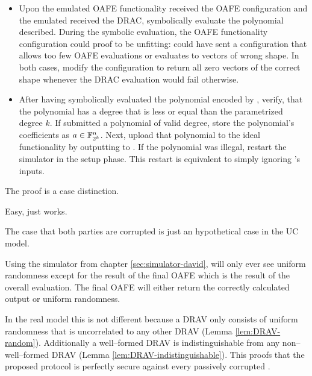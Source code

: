\begin{itemize}

  \item Upon the emulated OAFE functionality received the OAFE configuration and
    the emulated \JWpTwo{} received the DRAC, symbolically evaluate the
    polynomial \JWpOne{} described. During the symbolic evaluation, the OAFE
    functionality configuration could proof to be unfitting: \JWpOne{} could
    have sent a configuration that allows too few OAFE evaluations or evaluates
    to vectors of wrong shape. In both cases, modify the configuration to return
    all zero vectors of the correct shape whenever the DRAC evaluation would
    fail otherwise.

  \item After having symbolically evaluated the polynomial encoded by \JWpOne{},
    verify, that the polynomial has a degree that is less or equal than the
    parametrized degree $k$. If \JWpOne{} submitted a polynomial of valid
    degree, store the polynomial's coefficients as $a \in \mathbb{F}_{2^k}^n$.
    Next, upload that polynomial to the ideal functionality \JWfuncSymOPEnp{} by
    outputting  to \JWfuncSymOPEnp{}.  If the polynomial
    was illegal, restart the simulator in the setup phase.  This restart is
    equivalent to simply ignoring \JWpOne{}'s inputs.

\end{itemize}


%
%
\label{sec:proof}

The proof is a case distinction.



Easy, just works.




The case that both parties are corrupted is just an hypothetical case in the UC
model.



Using the simulator from chapter \ref{sec:simulator-david}, \JWpTwo{} will only
ever see uniform randomness except for the result of the final OAFE which is the
result of the overall evaluation. The final OAFE will either
return the correctly calculated output or uniform randomness.

In the real model this is not different because a DRAV only consists of uniform
randomness that is uncorrelated to any other DRAV (Lemma \ref{lem:DRAV-random}).
Additionally a well--formed DRAV is indistinguishable from any non--well--formed
DRAV (Lemma \ref{lem:DRAV-indistinguishable}). This proofs that the proposed
protocol is perfectly secure against every passively corrupted \JWpTwo{}.

